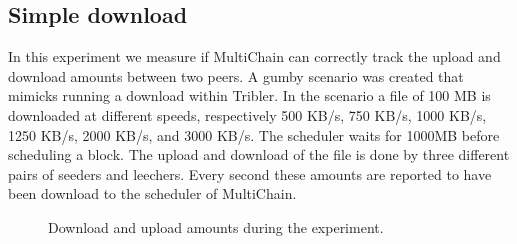 \subsection{Simple download }
In this experiment we measure if MultiChain can correctly track the upload and download amounts between two peers.
A gumby scenario was created that mimicks running a download within Tribler.
In the scenario a file of 100 MB is downloaded at different speeds,
respectively 500 KB/s, 750 KB/s, 1000 KB/s, 1250 KB/s, 2000 KB/s, and 3000 KB/s.
The scheduler waits for 1000MB before scheduling a block.
The upload and download of the file is done by three different pairs of seeders and leechers.
Every second these amounts are reported to have been download to the scheduler of MultiChain.

\begin{figure}
\centering
{}
\caption{Download and upload amounts during the experiment.}
\label{fig:synthetic-simple-amounts}
\end{figure}


